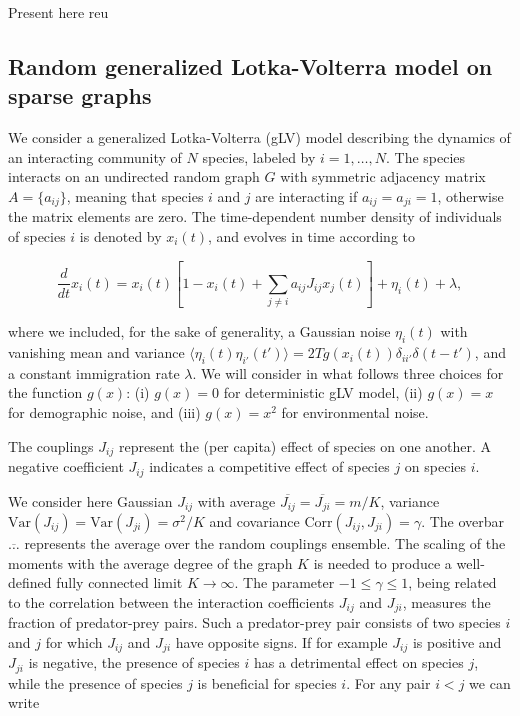 \documentclass[
    preprint,
    linenumbers,
    amsmath,amssymb,amsfonts,
    aps, physrev,
    superscriptaddress,
    10pt,
    bibnotes
    ]{revtex4-2}
\begin{document}
Present here reu


\subsection{Random generalized Lotka-Volterra model on sparse graphs}

We consider a generalized Lotka-Volterra (gLV) model describing the dynamics
of an interacting community of $N$ species, labeled by $i=1,\dots,N$.
The species interacts on an undirected random graph $G$ with symmetric
adjacency matrix $A=\{a_{ij}\}$, meaning that species $i$ and $j$
are interacting if $a_{ij}=a_{ji}=1$, otherwise the matrix elements
are zero. The time-dependent number density of individuals of species
$i$ is denoted by $x_{i}(t)$, and evolves in time according to

\begin{equation}
\frac{d}{dt}x_{i}(t)=x_{i}(t)\left[1-x_{i}(t)+\sum_{j\neq i}a_{ij}J_{ij}x_{j}(t)\right]+\eta_{i}(t) + \lambda,\label{eq:Lotka-Volterra_eq}
\end{equation}

where we included, for the sake of generality, a Gaussian noise $\eta_{i}(t)$ with vanishing mean and variance $\langle\eta_{i}(t)\eta_{i'}(t')\rangle=2Tg(x_i(t))\delta_{ii'}\delta(t-t')$, and a constant immigration rate $\lambda$. We will consider in what follows three choices for the function $g(x)$: (i) $g(x)=0$ for deterministic gLV model, (ii) $g(x)=x$ for demographic noise, and (iii) $g(x)=x^2$ for environmental noise.

The couplings $J_{ij}$ represent the (per capita) effect of species
on one another. A negative coefficient $J_{ij}$ indicates a competitive
effect of species $j$ on species $i$.

We consider here Gaussian $J_{ij}$ with average $\overline{J_{ij}}=\overline{J_{ji}}=m/K$,
variance $\text{Var}(J_{ij})=\text{Var}(J_{ji})=\sigma^{2}/K$ and
covariance $\text{Corr}(J_{ij},J_{ji})=\gamma$. The overbar $\overline{\dots}$
represents the average over the random couplings ensemble. The scaling
of the moments with the average degree of the graph $K$ is needed
to produce a well-defined fully connected limit $K\to\infty$. The
parameter $-1\leq\gamma\leq1$, being related to the correlation between
the interaction coefficients $J_{ij}$ and $J_{ji}$, measures the
fraction of predator-prey pairs. Such a predator-prey pair consists
of two species $i$ and $j$ for which $J_{ij}$ and $J_{ji}$ have
opposite signs. If for example $J_{ij}$ is positive and $J_{ji}$
is negative, the presence of species $i$ has a detrimental effect
on species $j$, while the presence of species $j$ is beneficial
for species $i$. For any pair $i<j$ we can write
\end{document}
